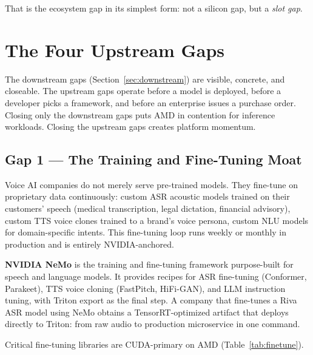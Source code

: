 \documentclass[blind]{gtac}
\begin{document}
That is the ecosystem gap in its simplest form: not a silicon gap, but a \emph{slot gap}.

\section{The Four Upstream Gaps}
\label{sec:upstream}

The downstream gaps (Section~\ref{sec:downstream}) are visible, concrete, and closeable. The upstream gaps operate before a model is deployed, before a developer picks a framework, and before an enterprise issues a purchase order. Closing only the downstream gaps puts AMD in contention for inference workloads. Closing the upstream gaps creates platform momentum.

\subsection{Gap 1 --- The Training and Fine-Tuning Moat}

Voice AI companies do not merely serve pre-trained models. They fine-tune on proprietary data continuously: custom ASR acoustic models trained on their customers' speech (medical transcription, legal dictation, financial advisory), custom TTS voice clones trained to a brand's voice persona, custom NLU models for domain-specific intents. This fine-tuning loop runs weekly or monthly in production and is entirely NVIDIA-anchored.

\textbf{NVIDIA NeMo} is the training and fine-tuning framework purpose-built for speech and language models. It provides recipes for ASR fine-tuning (Conformer, Parakeet), TTS voice cloning (FastPitch, HiFi-GAN), and LLM instruction tuning, with Triton export as the final step. A company that fine-tunes a Riva ASR model using NeMo obtains a TensorRT-optimized artifact that deploys directly to Triton: from raw audio to production microservice in one command.

Critical fine-tuning libraries are CUDA-primary on AMD (Table~\ref{tab:finetune}).
\end{document}

